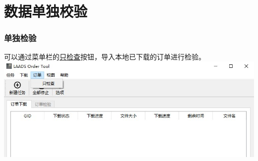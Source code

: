 \section{数据单独校验}
\begin{frame}
    \frametitle{单独检验}
可以通过菜单栏的\underline{只检查}按钮，导入本地已下载的订单进行检验。
\includegraphics[width=\linewidth]{images/2B.17单独检验.jpg}
    

\end{frame}